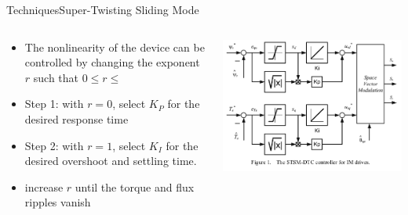 \documentclass{beamer}
\begin{document}
\begin{frame}{Techniques}{Super-Twisting Sliding Mode\cite{6954103}}\begin{footnotesize}
\begin{columns}
    \begin{column}{0.47\textwidth}
        \begin{itemize}
        		\item The nonlinearity of the device can be controlled by changing the exponent $r$ such that $0 \leq r \leq $
			\item Step 1: with $r=0$, select $K_P$ for the desired response time
			\begin{itemize}\end{itemize}
			\item Step 2: with $r=1$, select $K_I$ for the desired overshoot and settling time.  
				\begin{itemize}\end{itemize}
			\item increase $r$ until the torque and flux ripples vanish
        \end{itemize}
    \end{column}
    \begin{column}{0.5\textwidth}
        \includegraphics[scale=.25]{./images/stsm_dtc_controller.png}
    \end{column}
\end{columns}\end{footnotesize}
\end{frame}
\end{document}
